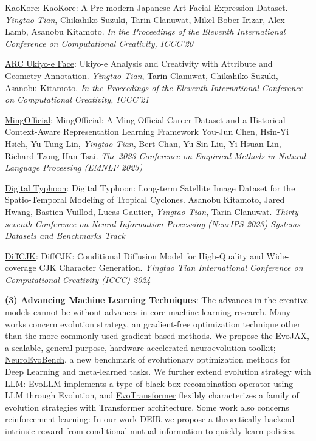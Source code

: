 \documentclass[line,margin]{cv}
\begin{document}
\begin{resume}
  \underline{KaoKore}: {KaoKore: A Pre-modern Japanese Art Facial Expression Dataset}.
  \emph{Yingtao Tian}, Chikahiko Suzuki, Tarin Clanuwat, Mikel Bober-Irizar, Alex Lamb, Asanobu Kitamoto. \emph{In the Proceedings of the Eleventh International Conference on Computational Creativity, ICCC'20}

  \underline{ARC Ukiyo-e Face}: {Ukiyo-e Analysis and Creativity with Attribute and Geometry Annotation}.
  \emph{Yingtao Tian}, Tarin Clanuwat, Chikahiko Suzuki, Asanobu Kitamoto. \emph{In the Proceedings of the Eleventh International Conference on Computational Creativity, ICCC'21}

  \underline{MingOfficial}: {MingOfficial: A Ming Official Career Dataset and a Historical Context-Aware Representation Learning Framework}
  You-Jun Chen, Hsin-Yi Hsieh, Yu Tung Lin, \emph{Yingtao Tian}, Bert Chan, Yu-Sin Liu, Yi-Hsuan Lin, Richard Tzong-Han Tsai. \emph{The 2023 Conference on Empirical Methods in Natural Language Processing (EMNLP 2023)}

  \underline{Digital Typhoon}: {Digital Typhoon: Long-term Satellite Image Dataset for the Spatio-Temporal Modeling of Tropical Cyclones}.
  Asanobu Kitamoto, Jared Hwang, Bastien Vuillod, Lucas Gautier, \emph{Yingtao Tian}, Tarin Clanuwat. \emph{Thirty-seventh Conference on Neural Information Processing (NeurIPS 2023) Systems Datasets and Benchmarks Track}

  \underline{DiffCJK}: {DiffCJK: Conditional Diffusion Model for High-Quality and Wide-coverage CJK Character Generation}.
  \emph{Yingtao Tian} \emph{International Conference on Computational Creativity (ICCC) 2024}

  \textbf{(3) Advancing Machine Learning Techniques}: The advances in the creative models cannot be without advances in core machine learning research.
  Many works concern {evolution strategy}, an gradient-free optimization technique other than the more commonly used gradient based methods. 
  We propose the \underline{EvoJAX}, a scalable, general purpose, hardware-accelerated {neuroevolution toolkit}; \underline{NeuroEvoBench}, a new {benchmark of evolutionary optimization methods} for Deep Learning and meta-learned tasks.  
  We further extend evolution strategy with LLM: \underline{EvoLLM} implements a type of {black-box recombination operator using LLM through Evolution}, and \underline{EvoTransformer} flexibly characterizes a family of {evolution strategies with Transformer architecture}.
  Some work also concerns {reinforcement learning}: In our work \underline{DEIR} we propose a theoretically-backend intrinsic reward from conditional mutual information to quickly learn policies.



\end{resume}
\end{document}
